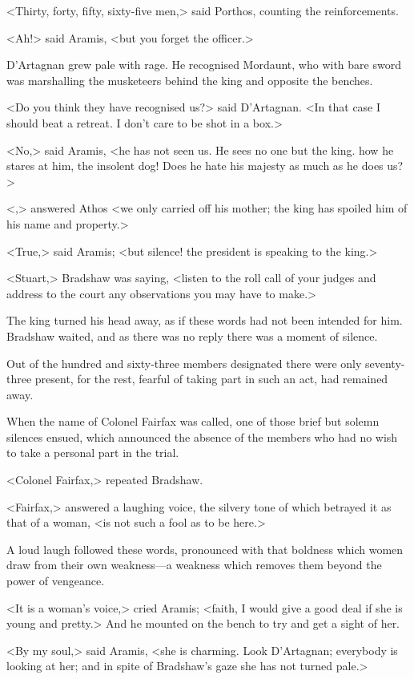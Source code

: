 <Thirty, forty, fifty, sixty-five men,> said Porthos, counting the reinforcements.

<Ah!> said Aramis, <but you forget the officer.>

D'Artagnan grew pale with rage. He recognised Mordaunt, who with bare sword was marshalling the musketeers behind the king and opposite the benches.

<Do you think they have recognised us?> said D'Artagnan. <In that case I should beat a retreat. I don't care to be shot in a box.>

<No,> said Aramis, <he has not seen us. He sees no one but the king.  how he stares at him, the insolent dog! Does he hate his majesty as much as he does us?>

<,> answered Athos <we only carried off his mother; the king has spoiled him of his name and property.>

<True,> said Aramis; <but silence! the president is speaking to the king.>

<Stuart,> Bradshaw was saying, <listen to the roll call of your judges and address to the court any observations you may have to make.>

The king turned his head away, as if these words had not been intended for him. Bradshaw waited, and as there was no reply there was a moment of silence.

Out of the hundred and sixty-three members designated there were only seventy-three present, for the rest, fearful of taking part in such an act, had remained away.

When the name of Colonel Fairfax was called, one of those brief but solemn silences ensued, which announced the absence of the members who had no wish to take a personal part in the trial.

<Colonel Fairfax,> repeated Bradshaw.

<Fairfax,> answered a laughing voice, the silvery tone of which betrayed it as that of a woman, <is not such a fool as to be here.>

A loud laugh followed these words, pronounced with that boldness which women draw from their own weakness—a weakness which removes them beyond the power of vengeance.

<It is a woman's voice,> cried Aramis; <faith, I would give a good deal if she is young and pretty.> And he mounted on the bench to try and get a sight of her.

<By my soul,> said Aramis, <she is charming. Look D'Artagnan; everybody is looking at her; and in spite of Bradshaw's gaze she has not turned pale.>

